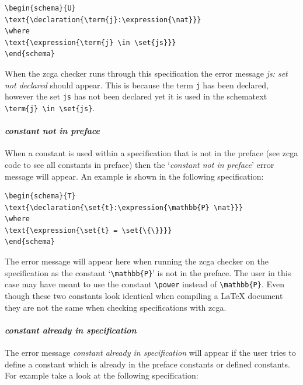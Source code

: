 \begin{exam}
\begin{verbatim}       
\begin{schema}{U}
\text{\declaration{\term{j}:\expression{\nat}}}
\where
\text{\expression{\term{j} \in \set{js}}}
\end{schema}
\end{verbatim}
\end{exam}

When the \gls{zcga} checker runs through this specification the error message
\emph{js: set not declared} should appear. This is because the term \verb|j| has
been declared, however the set \verb|js| has not been declared yet it is used in
the schematext \verb|\term{j} \in \set{js}|.

\paragraph{\emph{constant not in preface}}

When a constant is used within a specification that is not in the preface (see
\gls{zcga} code to see all constants in preface) then the `\emph{constant not in
preface}' error message will appear. An example is shown in the following
specification:

\begin{exam}
\begin{verbatim}       
\begin{schema}{T}
\text{\declaration{\set{t}:\expression{\mathbb{P} \nat}}}
\where
\text{\expression{\set{t} = \set{\{\}}}}
\end{schema}
\end{verbatim}
\end{exam}

The error message will appear here when running the \gls{zcga} checker on the
specification as the constant `\verb|\mathbb{P}|' is not in the preface. The
user in this case may have meant to use the constant \verb|\power| instead of
\verb|\mathbb{P}|. Even though these two constants look identical when compiling
a \LaTeX{} document they are not the same when checking specifications with
\gls{zcga}.

\paragraph{\emph{constant already in specification}}

The error message \emph{constant already in specification} will appear if the
user tries to define a constant which is already in the preface constants or
defined constants. For example take a look at the following specification:

